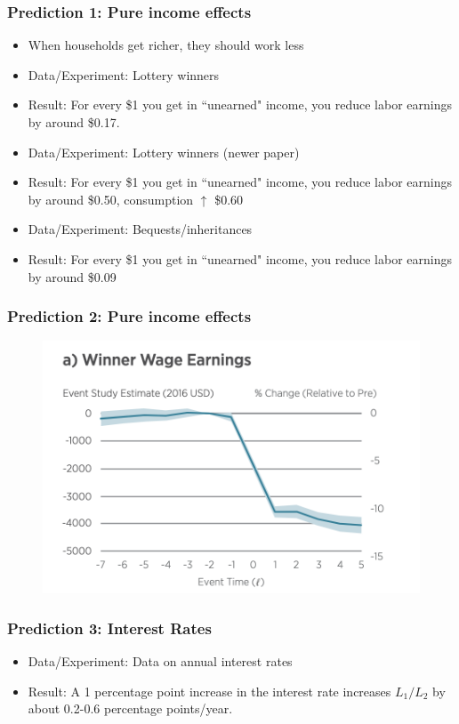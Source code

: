 \documentclass{beamer}
\begin{document}
\begin{frame}
\frametitle{Prediction 1: Pure income effects}
\begin{itemize}
\item When households get richer, they should work less  
\bigskip
\item Data/Experiment:  Lottery winners
\bigskip
\item Result:  For every \$1 you get in ``unearned" income, you reduce labor earnings by around \$0.17.
\bigskip
\item Data/Experiment:  Lottery winners (newer paper)
\bigskip
\item Result:  For every \$1 you get in ``unearned" income, you reduce labor earnings by around \$0.50, consumption $\uparrow$ \$0.60
\bigskip
\item Data/Experiment:  Bequests/inheritances
\bigskip
\item Result:  For every \$1 you get in ``unearned" income, you reduce labor earnings by around \$0.09
\end{itemize}
\end{frame}

\begin{frame}
\frametitle{Prediction 2: Pure income effects}
\begin{figure}
\centering
\includegraphics[scale=0.6]{Mogstad.png}
\end{figure}
\end{frame}




\begin{frame}
\frametitle{Prediction 3: Interest Rates}
\begin{itemize}
\item Data/Experiment:  Data on annual interest rates
\bigskip
\item Result:  A 1 percentage point increase in the interest rate increases $L_1/L_2$ by about 0.2-0.6 percentage points/year.
\end{itemize}
\end{frame}
\end{document}
